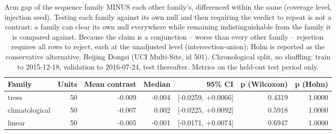\begin{table}[htbp]
\caption{Arm gap of the sequence family MINUS each other family's, differenced within the same (coverage level, injection seed). Testing each family against its own null and then requiring the verdict to repeat is not a contrast: a family can clear its own null everywhere while remaining indistinguishable from the family it is compared against. Because the claim is a conjunction -- worse than every other family -- rejection requires all rows to reject, each at the unadjusted level (intersection-union); Holm is reported as the conservative alternative. Beijing Dongsi (UCI Multi-Site, id 501). Chronological split, no shuffling: train to 2015-12-18, validation to 2016-07-24, test thereafter. Metrics on the held-out test period only.}
\label{tab:ablation_family_contrasts}
\begin{tabular}{lrrrrrr}
\toprule
Family & Units & Mean contrast & Median & 95\% CI & p (Wilcoxon) & p (Holm) \\
\midrule
trees & 50 & -0.009 & -0.004 & [-0.0259, +0.0066] & 0.4319 & 1.0000 \\
climatological & 50 & -0.007 & 0.002 & [-0.0225, +0.0092] & 0.5918 & 1.0000 \\
linear & 50 & -0.005 & -0.001 & [-0.0171, +0.0074] & 0.6947 & 1.0000 \\
\bottomrule
\end{tabular}
\end{table}
